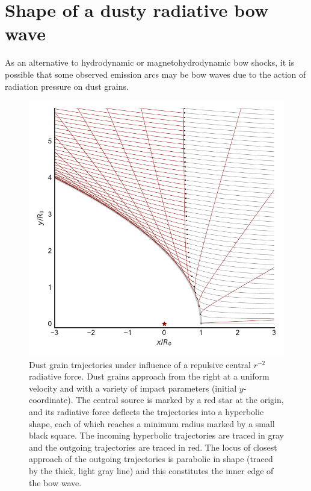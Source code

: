 
\section{Shape of a dusty radiative bow wave}
\label{sec:shape-dust-wave}

As an alternative to hydrodynamic or magnetohydrodynamic bow shocks,
it is possible that some observed emission arcs may be bow waves due
to the action of radiation pressure on dust grains.

\begin{figure}
  \centering
  \includegraphics[width=\linewidth]{figs/dust-trajectories}
  \caption[Dust grain trajectories]{Dust grain trajectories under
    influence of a repulsive central \(r^{-2}\) radiative force.  Dust
    grains approach from the right at a uniform velocity and with a
    variety of impact parameters (initial \(y\)-coordinate). The
    central source is marked by a red star at the origin, and its
    radiative force deflects the trajectories into a hyperbolic shape,
    each of which reaches a minimum radius marked by a small black
    square.  The incoming hyperbolic trajectories are traced in gray
    and the outgoing trajectories are traced in red.  The locus of
    closest approach of the outgoing trajectories is parabolic in
    shape (traced by the thick, light gray line) and this constitutes
    the inner edge of the bow wave. }
  \label{fig:dust-trajectories}
\end{figure}

